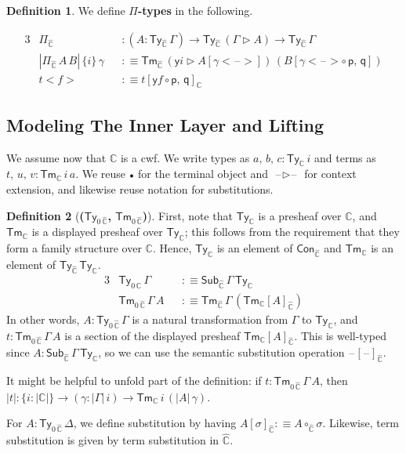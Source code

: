\documentclass[12pt,a4paper,twoside,openany]{book}
\theoremstyle{remark}
\theoremstyle{definition}
\newtheorem{mydefinition}{Definition}
\newcommand{\ms}[1]{\mathsf{#1}}
\newcommand{\mbb}[1]{\mathbb{#1}}
\newcommand{\Con}{\mathsf{Con}}
\newcommand{\Sub}{\mathsf{Sub}}
\newcommand{\Tm}{\mathsf{Tm}}
\newcommand{\Ty}{\mathsf{Ty}}
\newcommand{\blank}{\mathord{\hspace{1pt}\text{--}\hspace{1pt}}}
\newcommand{\ext}{\triangleright}
\newcommand{\emptycon}{\scaleobj{.75}\bullet}
\newcommand{\p}{\mathsf{p}}
\newcommand{\q}{\mathsf{q}}
\newcommand{\mbbC}{\mbb{C}}
\newcommand{\hmbbC}{\hat{\mbb{C}}}
\newcommand{\lab}{<\!}
\newcommand{\rab}{\!>}
\newcommand{\defn}{:\equiv}
\newcommand{\yon}{\ms{y}}
\begin{document}
\begin{mydefinition} We define \textbf{$\Pi$-types} in the following.

\begin{alignat*}{3}
  & \Pi_{\hmbbC} &&: (A : \Ty_{\hmbbC}\,\Gamma) \to \Ty_{\hmbbC}\,(\Gamma \ext A) \to \Ty_{\hmbbC}\,\Gamma\\
  & |\Pi_{\hmbbC}\,A\,B|\,\{i\}\,\gamma &&\defn \Tm_{\hmbbC}\,(\yon i \ext A[\gamma\!\lab\!\blank\!\rab])\,(B[\gamma\!\lab\!\blank\!\rab \circ\,\p,\,\q])\\
  & t\lab f \rab &&\defn t[\yon f \circ \p,\, \q]_{\hmbbC}
\end{alignat*}

\todo{Get rid of $\hmbbC$ subscripts}

\end{mydefinition}

\subsection{Modeling The Inner Layer and Lifting}

We assume now that $\mbbC$ is a cwf. We write types as $a,\,b,\,c :
\Ty_\mbbC\,i$ and terms as $t,\,u,\,v : \Tm_\mbbC\,i\,a$. We reuse $\emptycon$
for the terminal object and $\blank\ext\blank$ for context extension, and
likewise reuse notation for substitutions.

\begin{mydefinition}[\textbf{($\Ty_{0\,\hmbbC}$, $\Tm_{0\,\hmbbC}$)}]
First, note that $\Ty_{\mbbC}$ is a presheaf over $\mbbC$, and $\Tm_{\mbbC}$ is
a displayed presheaf over $\Ty_{\mbbC}$; this follows from the requirement that
they form a family structure over $\mbbC$. Hence, $\Ty_{\mbbC}$ is an element of
$\Con_{\hmbbC}$ and $\Tm_{\mbbC}$ is an element of $\Ty_{\hmbbC}\,\Ty_{\mbbC}$.
\begin{alignat*}{3}
  & \Ty_{0\,\hmbbC}\,\Gamma &&\defn \Sub_{\hmbbC}\,\Gamma\,\Ty_{\mbbC}\\
  & \Tm_{0\,\hmbbC}\,\Gamma\,A &&\defn \Tm_{\hmbbC}\,\Gamma\,(\Tm_\mbbC[A]_{\hmbbC})
\end{alignat*}
In other words, $A : \Ty_{0\,\hmbbC}\,\Gamma$ is a natural transformation from
$\Gamma$ to $\Ty_{\mbbC}$, and $t : \Tm_{0\,\hmbbC}\,\Gamma\,A$ is a section of
the displayed presheaf $\Tm_\mbbC[A]_{\hmbbC}$. This is well-typed since $A :
\Sub_{\hmbbC}\,\Gamma\,\Ty_{\mbbC}$, so we can use the semantic substitution
operation $\blank[\blank]_{\hmbbC}$.

It might be helpful to unfold part of the definition: if $t :
\Tm_{0\,\hmbbC}\,\Gamma\,A$, then $|t| : \{i : |\mbbC|\} \to (\gamma : |\Gamma|\,i) \to
\Tm_{\mbbC}\,i\,(|A|\,\gamma)$.

For $A : \Ty_{0\,\hmbbC}\,\Delta$, we define substitution by having
$A[\sigma]_{\hmbbC} \defn A \circ_{\hmbbC} \sigma$.  Likewise, term substitution
is given by term substitution in $\hmbbC$.
\end{mydefinition}
\end{document}

